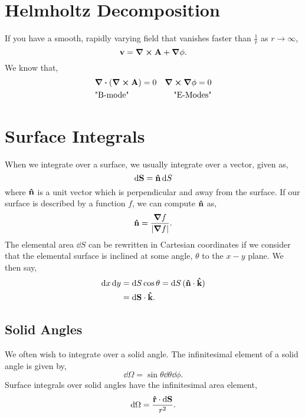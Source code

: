 \documentclass{book}
\begin{document}
\section{Helmholtz Decomposition}
If you have a smooth, rapidly varying field that vanishes faster than $\frac{1}{r}$ as $r \to \infty$,
\begin{equation}
    \vb{v} = \curl{\vb{\vb{A}}} + \grad\phi.
\end{equation}
We know that,
\begin{align}
    &\div{(\curl{\vb{A}})} = 0 & \curl{\grad\phi} = 0&\\
    &\text{"B-mode"} & \text{"E-Modes"}&
\end{align}

\section{Surface Integrals}
When we integrate over a surface, we usually integrate over a vector, given as,
\begin{equation}
    \dd{\vb{S}} = \vu{n}\dd{S}
\end{equation}
where $\vu{n}$ is a unit vector which is perpendicular and away from the surface. If our surface is described by a function $f$, we can compute $\vu{n}$ as,
\begin{equation}
    \vu{n} = \frac{\grad f}{\left|\grad f\right|}.
\end{equation}
The elemental area $\dd{S}$ can be rewritten in Cartesian coordinates if we consider that the elemental surface is inclined at some angle, $\theta$ to the $x-y$ plane. We then say,
\begin{equation}
    \begin{split}
        \dd{x}\dd{y} & = \dd{S}\cos\theta = \dd{S}(\vu{n}\cdot\vu{k}) \\
        & = \dd{\vb{S}}\cdot\vu{k}.
    \end{split}
\end{equation}
\subsection{Solid Angles}
We often wish to integrate over a solid angle. The infinitesimal element of a solid angle is given by,
\begin{equation}
    \dd{\Omega} = \sin\theta\dd{\theta}\dd{\phi}.
\end{equation}
Surface integrals over solid angles have the infinitesimal area element,
\begin{equation}
    \dd{\Omega} = \frac{\vu{r}\cdot\dd{\vb{S}}}{r^2}.
\end{equation}
\end{document}
